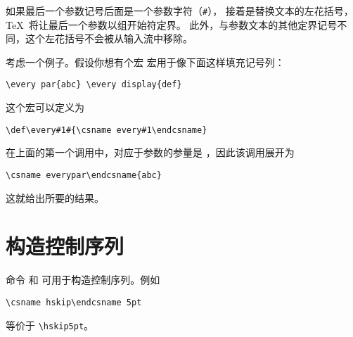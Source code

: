 \documentclass{book}
\begin{document}
如果最后一个参数记号后面是一个参数字符（\verb>#>），
接着是替换文本的左花括号，\TeX\ 将让最后一个参数以组开始符定界。
此外，与参数文本的其他定界记号不同，这个左花括号不会被从输入流中移除。

考虑一个例子。假设你想有个宏  宏用于像下面这样填充记号列：
\begin{verbatim}
\every par{abc} \every display{def}
\end{verbatim}
这个宏可以定义为
\begin{verbatim}
\def\every#1#{\csname every#1\endcsname}
\end{verbatim}
在上面的第一个调用中，对应于参数的参量是 ，因此该调用展开为
\begin{verbatim}
\csname everypar\endcsname{abc}
\end{verbatim}
这就给出所要的结果。


\section{构造控制序列}
\label{cs:name}

命令  和  可用于构造控制序列。例如
\begin{verbatim}
\csname hskip\endcsname 5pt
\end{verbatim}
等价于 \verb=\hskip5pt=。
\end{document}
